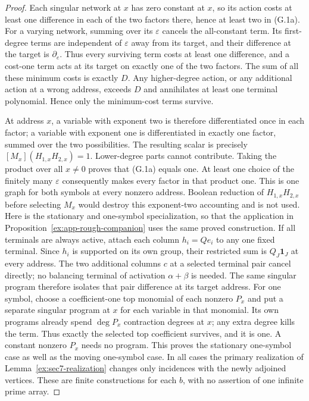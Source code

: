 \begin{proof}
Each singular network at $x$ has zero constant at $x$, so its action
costs at least one difference in each of the two factors there, hence
at least two in (G.1a).  For a varying network, summing over its
$\varepsilon$ cancels the all-constant term.  Its first-degree
terms are independent of $\varepsilon$ away from its target, and
their difference at the target is $\partial_e$.  Thus every
surviving term costs at least one difference, and a cost-one term
acts at its target on exactly one of the two factors.  The sum of
all these minimum costs is exactly $D$.  Any higher-degree action,
or any additional action at a wrong address, exceeds $D$ and
annihilates at least one terminal polynomial.  Hence only the
minimum-cost terms survive.

At address $x$, a variable with exponent two is therefore
differentiated once in each factor; a variable with exponent one
is differentiated in exactly one factor, summed over the two
possibilities.  The resulting scalar is precisely
$[M_x](H_{1,x}H_{2,x})=1$.  Lower-degree parts cannot contribute.
Taking the product over all $x\ne0$ proves that (G.1a) equals one.
At least one choice of the finitely many $\varepsilon$ consequently
makes every factor in that product one.  This is one graph for both
symbols at every nonzero address.  Boolean reduction of
$H_{1,x}H_{2,x}$ before selecting $M_x$ would destroy this
exponent-two accounting and is not used.
Here is the stationary and one-symbol specialization, so that the
application in Proposition~\ref{ex:app-rough-companion} uses the same
proved construction. If all terminals are always active, attach
each column $h_i=Qe_i$ to any one fixed terminal. Since $h_i$ is
supported on its own group, their restricted sum is
$Q_J\mathbf1_J$ at every address. The two additional columns $c$
at a selected terminal pair cancel directly; no balancing terminal
of activation $\alpha+\beta$ is needed. The same singular program
therefore isolates that pair difference at its target address.
For one symbol, choose a coefficient-one top monomial of each
nonzero $P_x$ and put a separate singular program at $x$ for each
variable in that monomial. Its own programs already spend
$\deg P_x$ contraction degrees at $x$; any extra degree kills the
term. Thus exactly the selected top coefficient survives, and it
is one. A constant nonzero $P_x$ needs no program. This proves the
stationary one-symbol case as well as the moving one-symbol case.
In all cases the primary realization of
Lemma~\ref{ex:sec7-realization} changes only incidences with
the newly adjoined vertices. These are finite constructions for
each $b$, with no assertion of one infinite prime array.

\end{proof}

